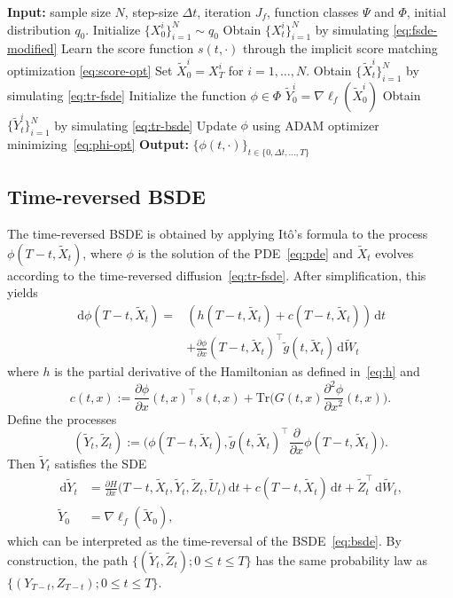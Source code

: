 \documentclass[letterpaper, 10 pt, conference]{ieeeconf}  %
\def\argmin{\mathop{\text{\rm arg\,min}}}
\newcommand{\trace}{\text{Tr}}
\newcommand{\ud}{\,\mathrm{d}}
\def\argmin{\mathop{\text{\rm arg\,min}}}
\newcommand{\Xr}{\tilde X}
\newcommand{\gr}{\tilde g}
\newcommand{\Ur}{\tilde U}
\newcommand{\Wr}{\tilde W}
\newcommand{\Yr}{\tilde Y}
\newcommand{\Zr}{\tilde Z}
\begin{document}
\begin{algorithm}[htbp]
\caption{Time-Reversal BSDE solver} 
\begin{algorithmic}[1]
\STATE \textbf{Input:}  sample size $N$, step-size $\Delta t$, iteration $J_f$, function classes $\Psi$ and $\Phi$, initial distribution $q_0$.   
\STATE  Initialize $\{X_0^i\}_{i=1}^N \sim q_0$
\STATE Obtain $\{X^i_t\}_{i=1}^N$ by simulating \eqref{eq:fsde-modified}
\STATE Learn the score function $s(t,\cdot)$ through the implicit score matching optimization \eqref{eq:score-opt}
\STATE Set $\Xr_0^i = X_T^i$ for $i=1,\ldots,N$. 
\STATE  Obtain $\{\Xr^i_t\}_{i=1}^N$ by simulating  \eqref{eq:tr-fsde}
\STATE Initialize the function $\phi \in \Phi$
\STATE $\tilde Y_0^i =  \nabla \ell_f (\Xr_0^i)$
\STATE Obtain $\{\Yr^i_t\}_{i=1}^N$ by simulating  \eqref{eq:tr-bsde}
 \STATE Update $\phi$ using ADAM optimizer minimizing~\eqref{eq:phi-opt}   
\ENDFOR
 \STATE \textbf{Output:}  $\{\phi(t,\cdot)\}_{t\in \{0,\Delta t,\ldots,T\} }$
\end{algorithmic}
\label{alg:phi}
\end{algorithm}

\subsection{Time-reversed BSDE}
The time-reversed BSDE is obtained by applying It\^o's formula to the process
$\phi(T-t,\Xr_t)$, where $\phi$ is the solution of the PDE~\eqref{eq:pde} and 
$\Xr_t$ evolves according to the time-reversed diffusion~\eqref{eq:tr-fsde}. 
After simplification, this yields
\begin{align*}
    \ud \phi(T-t,\Xr_t) = &\left(h(T-t,\Xr_t) + c(T-t,\Xr_t) \right) \ud t \\&+ \frac{\partial \phi}{\partial x}(T\!-\!t,\Xr_t)^\top \gr(t,\Xr_t)\ud \Wr_t
\end{align*}
where $h$ is the partial derivative of the Hamiltonian as defined in~\eqref{eq:h} and \[c(t,x):=\frac{\partial \phi}{\partial x} (t,x)^\top s(t,x) +\trace\big(G(t,x)\frac{\partial^2\phi}{\partial x^2}(t,x)\big).\]
Define the processes
\begin{equation}
    (\Yr_t,\Zr_t):=\big(\phi(T-t,\Xr_t),\gr(t,\Xr_t)^\top \frac{\partial}{\partial x}\phi(T-t,\Xr_t)\big). 
\end{equation}
Then $\Yr_t$ satisfies the SDE
\begin{align}
    \ud \Yr_t &= \frac{\partial H}{\partial x}\big(T-t,\Xr_t,\Yr_t,\Zr_t,\Ur_t\big)\ud t + c(T-t,\tilde X_t)\ud t + \tilde Z_t^\top \ud \tilde W_t, \nonumber \\
    \Yr_0 &= \nabla \ell_f (\Xr_0),\label{eq:tr-bsde}
\end{align}
which can be interpreted as the time-reversal of the BSDE~\eqref{eq:bsde}.  
By construction, the path $\{(\Yr_t,\Zr_t);0\leq t \leq T\}$ has the same probability law as $\{( Y_{T-t}, Z_{T-t});0\leq t \leq T\}$.
\end{document}
